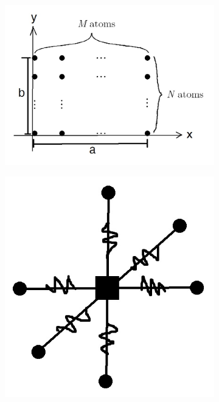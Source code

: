\documentclass[letterpaper,12pt]{article}
\begin{document}
\begin{flushleft}
\begin{figure}[h]
\begin{subfigure}[b]{0.6\textwidth}
            \includegraphics[width=\textwidth]{images/I2.jpg}
            \caption{}
            \label{fig:I2}
        \end{subfigure}
        \quad
        \begin{subfigure}[b]{0.3\textwidth}
            \includegraphics[width=\textwidth]{images/I3.jpg}
            \caption{}
            \label{fig:I3}

\end{subfigure}
\end{figure}
\end{flushleft}
\end{document}
